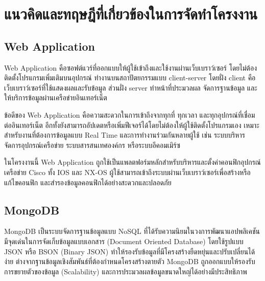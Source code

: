 \hspace*{1.3em} %

\hspace*{1.3em} %

\hspace*{1.3em} %

\hspace*{1.3em} %

\hspace*{1.3em} %

\hspace*{1.3em} %

\hspace*{1.3em} %

\hspace*{1.3em} %
\section{แนวคิดและทฤษฎีที่เกี่ยวข้องในการจัดทำโครงงาน}

\subsection{Web Application}
\hspace*{1.3em} %
Web Application คือซอฟต์แวร์ที่ออกแบบให้ผู้ใช้เข้าถึงและใช้งานผ่านเว็บเบราว์เซอร์ โดยไม่ต้องติดตั้งโปรแกรมเพิ่มเติมบนอุปกรณ์ ทำงานบนสถาปัตยกรรมแบบ client-server โดยฝั่ง client คือเว็บเบราว์เซอร์ที่ใช้แสดงผลและรับข้อมูล ส่วนฝั่ง server ทำหน้าที่ประมวลผล จัดการฐานข้อมูล และให้บริการข้อมูลผ่านเครือข่ายอินเทอร์เน็ต

\hspace*{1.3em} %
ข้อดีของ Web Application คือความสะดวกในการเข้าถึงจากทุกที่ ทุกเวลา และทุกอุปกรณ์ที่เชื่อมต่ออินเทอร์เน็ต อีกทั้งยังสามารถอัปเดตหรือเพิ่มฟีเจอร์ได้โดยไม่ต้องให้ผู้ใช้ติดตั้งโปรแกรมเอง เหมาะสำหรับงานที่ต้องการข้อมูลแบบ Real Time และการทำงานร่วมกันหลายผู้ใช้ เช่น ระบบบริหารจัดการอุปกรณ์เครือข่าย ระบบสารสนเทศองค์กร หรือระบบอีคอมเมิร์ซ


\hspace*{1.3em} %
ในโครงงานนี้ Web Application ถูกใช้เป็นแพลตฟอร์มหลักสำหรับบริหารและตั้งค่าคอนฟิกอุปกรณ์เครือข่าย Cisco ทั้ง IOS และ NX-OS ผู้ใช้สามารถเข้าถึงระบบผ่านเว็บเบราว์เซอร์เพื่อสร้างหรือแก้ไขคอนฟิก และสำรองข้อมูลคอนฟิกได้อย่างสะดวกและปลอดภัย
\parencite{web}

\subsection{MongoDB}
\hspace*{1.3em} %
MongoDB เป็นระบบจัดการฐานข้อมูลแบบ NoSQL ที่ได้รับความนิยมในวงการพัฒนาแอปพลิเคชัน มีจุดเด่นในการจัดเก็บข้อมูลแบบเอกสาร (Document Oriented Database) โดยใช้รูปแบบ JSON หรือ BSON (Binary JSON) ทำให้รองรับข้อมูลที่มีโครงสร้างยืดหยุ่นและปรับเปลี่ยนได้ง่าย ต่างจากฐานข้อมูลเชิงสัมพันธ์ที่ต้องกำหนดโครงสร้างตายตัว MongoDB ถูกออกแบบให้รองรับการขยายตัวของข้อมูล (Scalability) และการประมวลผลข้อมูลขนาดใหญ่ได้อย่างมีประสิทธิภาพ

